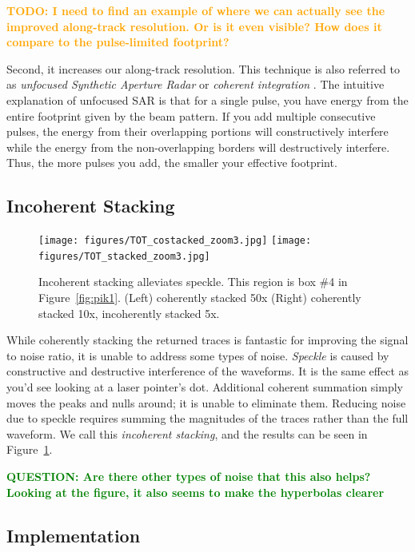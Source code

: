 \documentclass[11pt]{article}
\newcommand{\future}[1]{\ifthenelse{\boolean{include-future}} {\textcolor{Orange}{\textbf{TODO: #1}}}{}}
\newcommand{\question}[1]{\ifthenelse{\boolean{include-questions}} {\textcolor{Green}{\textbf{QUESTION: #1}}}{}}
\newcommand{\figref}[1]{Figure~\ref{#1}}
\begin{document}
\future{I need to find an example of where we can actually see the improved along-track resolution. Or is it even visible? How does it compare to the pulse-limited footprint?}

Second, it increases our along-track resolution. This technique is also referred to as \emph{unfocused Synthetic Aperture Radar} or \emph{coherent integration} \cite{Peters2005}.
The intuitive explanation of unfocused SAR is that for a single pulse, you have energy from the entire footprint given by the beam pattern. 
If you add multiple consecutive pulses, the energy from their overlapping portions will constructively interfere while the energy from the non-overlapping borders will destructively interfere. 
Thus, the more pulses you add, the smaller your effective footprint. 

\subsection{Incoherent Stacking}

\begin{figure}[ht!]
\centering
\texttt{[image: figures/TOT\_costacked\_zoom3.jpg]}
\texttt{[image: figures/TOT\_stacked\_zoom3.jpg]}
\caption[]{Incoherent stacking alleviates speckle. This region is box \#4 in \figref{fig:pik1}. (Left) coherently stacked 50x (Right) coherently stacked 10x, incoherently stacked 5x.}
\label{fig:incoherent_stacking}
\end{figure}

While coherently stacking the returned traces is fantastic for improving the signal to noise ratio, it is unable to address some types of noise.
\emph{Speckle} is caused by constructive and destructive interference of the waveforms. It is the same effect as you'd see looking at a laser pointer's dot. Additional coherent summation simply moves the peaks and nulls around; it is unable to eliminate them. Reducing noise due to speckle requires summing the magnitudes of the traces rather than the full waveform. We call this \emph{incoherent stacking}, and the results can be seen in \figref{fig:incoherent_stacking}.

\question{Are there other types of noise that this also helps? Looking at the figure, it also seems to make the hyperbolas clearer}



\subsection{Implementation}
\end{document}
